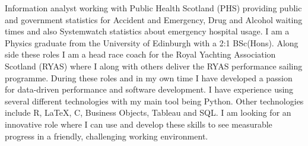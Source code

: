 

\begin{cvparagraph}
Information analyst working with Public Health Scotland (PHS) providing public and government statistics for Accident and Emergency, Drug and Alcohol waiting times and also Systemwatch statistics about emergency hospital usage. I am a Physics graduate from the University of Edinburgh with a 2:1 BSc(Hons). Along side these roles I am a head race coach for the Royal Yachting Association Scotland (RYAS) where I along with others deliver the RYAS performance sailing programme. During these roles and in my own time I have developed a passion for data-driven performance and software development. I have experience using several different technologies with my main tool being Python. Other technologies include R, LaTeX, C, Business Objects, Tableau and SQL. I am looking for an innovative role where I can use and develop these skills to see measurable progress in a friendly, challenging working environment.

\end{cvparagraph}
